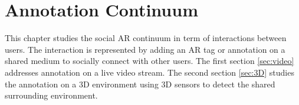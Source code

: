 \chapter{Annotation Continuum} %
\label{ch:annotation} %

This chapter studies the social AR continuum in term of interactions between users. The interaction is represented by adding an AR tag or annotation on a shared medium to socially connect with other users. The first section \ref{sec:video} addresses annotation on a live video stream. The second section \ref{sec:3D} studies the annotation on a 3D environment using 3D sensors to detect the shared surrounding environment. 






